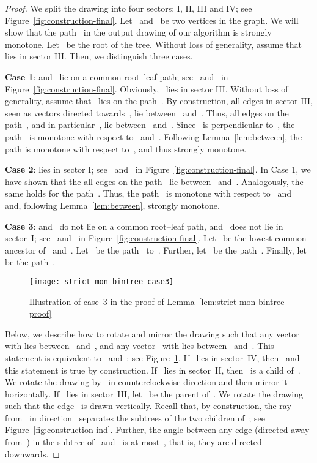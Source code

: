 \documentclass[a4paper,11pt]{article}
\theoremstyle{plain}
\begin{document}
\begin{proof}
  We split the drawing into four sectors: I, II, III and IV; see
  Figure~\ref{fig:construction-final}. Let~ and~ be two vertices in the 
  graph. We will show that the path~ in the
  output drawing of our algorithm is strongly monotone. 
  Let~ be the root of the tree. Without loss of generality, assume that~ 
  lies in sector III. Then, we distinguish three cases. 
  
  \textbf{Case 1}:  and~ lie on a common root--leaf path; see~ and~ 
    in Figure~\ref{fig:construction-final}. Obviously,~ lies in sector III.
    Without loss of generality, assume that~ lies on the path~.
    By construction, all edges in sector III, seen as vectors
    directed towards~, lie between~ 
    and~. Thus, all edges on the path~, and in
    particular~, lie between~ and~.
    Since~ is perpendicular to~, the path~ is
    monotone with respect to~ and~. Following
    Lemma~\ref{lem:between}, the path  is monotone with
    respect to~, and thus strongly monotone.
  
  \textbf{Case 2}:  lies in sector I; see~ and~ in
    Figure~\ref{fig:construction-final}. In Case 1, we have shown that
    the all edges on the path~ lie
    between~ and~. Analogously, the same holds
    for the path~. Thus, the path~ is monotone
    with respect to~ and~ and, following
    Lemma~\ref{lem:between}, strongly monotone.
  
    \textbf{Case 3}:  and~ do not lie on a common root--leaf
    path, and~ does not lie in sector~I; see~ and~ in
    Figure~\ref{fig:construction-final}.  Let~ be the lowest
    common ancestor of~ and~. Let~
    be the path~ to~.
    Further, let~ be the path~. 
    Finally, let 
    be the path~.
    
    \begin{figure}[t]
      \centering
      \texttt{[image: strict-mon-bintree-case3]}
      \caption{Illustration of case~3 in the proof of
        Lemma~\ref{lem:strict-mon-bintree-proof}}
      \label{fig:strict-mon-bintree-case3}
    \end{figure}
    
    Below, we describe how to rotate and mirror the drawing such that
    any vector~ with  lies
    between~ and~, and any
    vector~ with  lies
    between~ and~. This statement is equivalent
    to~
    and~;
    see Figure~\ref{fig:strict-mon-bintree-case3}.
    If~ lies in sector~IV, then~ and this statement is true by
    construction. If~ lies in sector~II, then~ is a child
    of~. We rotate the drawing by~ in counterclockwise
    direction and then mirror it horizontally.
    If~ lies in sector~III, let~ be the parent of~. 
    We rotate the drawing such that the edge~ is drawn vertically. 
    Recall that, by construction, the ray from~ in 
    direction~ separates the subtrees of the two  
    children of~; see Figure~\ref{fig:construction-ind}. Further, the angle 
    between any edge (directed away from~) in the subtree of~ 
    and~ is at most~, that is, they are 
    directed downwards.
   

\end{proof}
\end{document}
